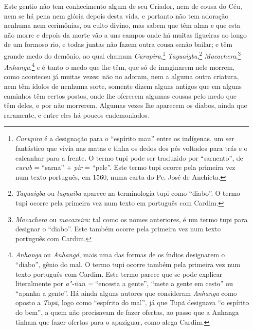  Este gentio não tem conhecimento algum de seu Criador, nem de cousa do
Céu, nem se há pena nem glória depois desta vida, e portanto não tem
adoração nenhuma nem cerimônias, ou culto divino, mas sabem que têm
alma e que esta não morre e depois da morte vão a uns campos onde há
muitas figueiras ao longo de um formoso rio, e todas juntas não fazem
outra cousa senão bailar; e têm grande medo do demônio, ao qual chamam
\textit{Curupira},\footnote{ \textit{Curupira} é a designação para o
``espírito mau'' entre os indígenas, um ser fantástico que vivia nas
matas e tinha os dedos dos pés voltados para trás e o calcanhar para a
frente. O termo tupi pode ser traduzido por ``sarnento'', de
\textit{curub} = ``sarna'' + \textit{pir} = ``pele''. Este termo tupi
ocorre pela primeira vez num texto português, em 1560, numa
carta do Pe. José de Anchieta.} \textit{Taguaigba},\footnote{ \textit{Taguaigba} 
ou \textit{taguaiba} aparece na
terminologia tupi como ``diabo''. O termo tupi ocorre pela primeira vez
num texto em português com Cardim.} \textit{Macachera},\footnote{ \textit{Macachera} ou \textit{macaxeira}: tal como os
nomes anteriores, é um termo tupi para designar o ``diabo''. Este também
ocorre pela primeira vez num texto português com Cardim.} \textit{
Anhanga},\footnote{ \textit{Anhanga} ou \textit{Anhangá}, mais uma
das formas de os índios designarem o ``diabo'', gênio do mal. O termo
tupi ocorre também pela primeira vez num texto português com Cardim.
Este termo parece que se pode explicar literalmente por \textit{a"-ñan =}
``encesta a gente'', ``mete a gente em cesto'' ou ``apanha a gente''. Há
ainda alguns autores que consideram \textit{Anhanga} como oposto a
\textit{Tupã}, logo como ``espírito do mal'', já que Tupã designava ``o
espírito do bem'', a quem não precisavam de fazer ofertas, ao passo que
a Anhanga tinham que fazer ofertas para o apaziguar, como alega
Cardim.}  e é tanto o medo que lhe têm, que só de imaginarem
nele morrem, como aconteceu já muitas vezes; não no adoram, nem a
alguma outra criatura, nem têm ídolos de nenhuma sorte, somente dizem
alguns antigos que em alguns caminhos têm certos postos, onde lhe
oferecem algumas cousas pelo medo que têm deles, e por não morrerem.
Algumas vezes lhe aparecem os diabos, ainda que raramente, e entre eles
há poucos endemoniados.

